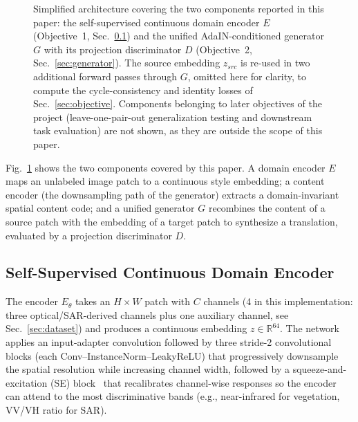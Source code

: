 \documentclass[runningheads]{llncs}
\begin{document}
\begin{figure}[t]
{}
\caption{Simplified architecture covering the two components reported in this paper: the self-supervised continuous domain encoder $E$ (Objective~1, Sec.~\ref{sec:encoder}) and the unified AdaIN-conditioned generator $G$ with its projection discriminator $D$ (Objective~2, Sec.~\ref{sec:generator}). The source embedding $z_{src}$ is re-used in two additional forward passes through $G$, omitted here for clarity, to compute the cycle-consistency and identity losses of Sec.~\ref{sec:objective}. Components belonging to later objectives of the project (leave-one-pair-out generalization testing and downstream task evaluation) are not shown, as they are outside the scope of this paper.}
\label{fig:architecture}
\end{figure}

Fig.~\ref{fig:architecture} shows the two components covered by this paper. A domain encoder $E$ maps an unlabeled image patch to a continuous style embedding; a content encoder (the downsampling path of the generator) extracts a domain-invariant spatial content code; and a unified generator $G$ recombines the content of a source patch with the embedding of a target patch to synthesize a translation, evaluated by a projection discriminator $D$.

\subsection{Self-Supervised Continuous Domain Encoder}
\label{sec:encoder}
The encoder $E_\theta$ takes an $H \times W$ patch with $C$ channels (4 in this implementation: three optical/SAR-derived channels plus one auxiliary channel, see Sec.~\ref{sec:dataset}) and produces a continuous embedding $z \in \mathbb{R}^{64}$. The network applies an input-adapter convolution followed by three stride-2 convolutional blocks (each Conv--InstanceNorm--LeakyReLU) that progressively downsample the spatial resolution while increasing channel width, followed by a squeeze-and-excitation (SE) block~\cite{hu2018senet} that recalibrates channel-wise responses so the encoder can attend to the most discriminative bands (e.g., near-infrared for vegetation, VV/VH ratio for SAR).
\end{document}
